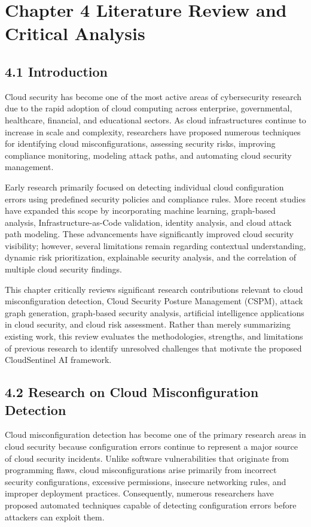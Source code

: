 \section{Chapter 4 Literature Review and Critical Analysis}

\subsection{4.1 Introduction}

Cloud security has become one of the most active areas of cybersecurity research due to the rapid adoption of cloud computing across enterprise, governmental, healthcare, financial, and educational sectors. As cloud infrastructures continue to increase in scale and complexity, researchers have proposed numerous techniques for identifying cloud misconfigurations, assessing security risks, improving compliance monitoring, modeling attack paths, and automating cloud security management.

Early research primarily focused on detecting individual cloud configuration errors using predefined security policies and compliance rules. More recent studies have expanded this scope by incorporating machine learning, graph-based analysis, Infrastructure-as-Code validation, identity analysis, and cloud attack path modeling. These advancements have significantly improved cloud security visibility; however, several limitations remain regarding contextual understanding, dynamic risk prioritization, explainable security analysis, and the correlation of multiple cloud security findings.

This chapter critically reviews significant research contributions relevant to cloud misconfiguration detection, Cloud Security Posture Management (CSPM), attack graph generation, graph-based security analysis, artificial intelligence applications in cloud security, and cloud risk assessment. Rather than merely summarizing existing work, this review evaluates the methodologies, strengths, and limitations of previous research to identify unresolved challenges that motivate the proposed CloudSentinel AI framework.

\subsection{4.2 Research on Cloud Misconfiguration Detection}

Cloud misconfiguration detection has become one of the primary research areas in cloud security because configuration errors continue to represent a major source of cloud security incidents. Unlike software vulnerabilities that originate from programming flaws, cloud misconfigurations arise primarily from incorrect security configurations, excessive permissions, insecure networking rules, and improper deployment practices. Consequently, numerous researchers have proposed automated techniques capable of detecting configuration errors before attackers can exploit them.


